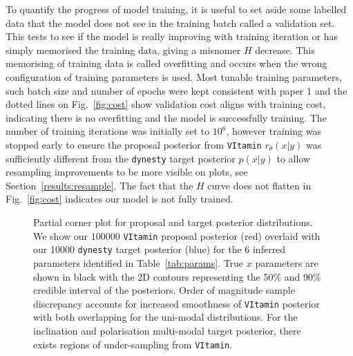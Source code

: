 \documentclass[a4paper]{jpconf}
\begin{document}
To quantify the progress of model training, it is useful to set aside some labelled data that the model does not see in the training batch called a validation set. This tests to see if the model is really improving with training iteration or has simply memorised the training data, giving a misnomer $H$ decrease. This memorising of training data is called overfitting and occurs when the wrong configuration of training parameters is used. Most tunable training parameters, such batch size and number of epochs were kept consistent with paper 1 and the dotted lines on Fig.~\ref{fig:cost} show validation cost aligns with training cost, indicating there is no overfitting and the model is successfully training. The number of training iterations was initially set to $10^6$, however training was stopped early to ensure the proposal posterior from \texttt{VItamin} $r_\theta(x|y)$ was sufficiently different from the \texttt{dynesty} target posterior $p(x|y)$ to allow resampling improvements to be more visible on plots, see Section~\ref{results:resample}. The fact that the $H$ curve does not flatten in Fig.~\ref{fig:cost} indicates our model is not fully trained. 

\begin{figure}
	\caption{Partial corner plot for proposal and target posterior distributions. We show our 100000 \texttt{VItamin} proposal posterior (red) overlaid with our 10000 \texttt{dynesty} target  posterior (blue) for the 6 inferred parameters identified in Table~\ref{tab:params}. True $x$ parameters are shown in black with the 2D contours representing the 50\% and 90\% credible interval of the posteriors. Order of magnitude sample discrepancy accounts for increased smoothness of \texttt{VItamin} posterior with both overlapping for the uni-modal distributions. For the inclination and polarisation multi-modal target posterior, there exists regions of under-sampling from \texttt{VItamin}.}
	\label{fig:vit_train_corner}
\end{figure}
\end{document}
